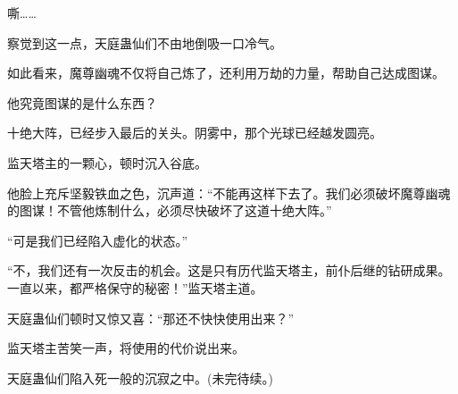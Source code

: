 \begin{this_body}
嘶……

察觉到这一点，天庭蛊仙们不由地倒吸一口冷气。

如此看来，魔尊幽魂不仅将自己炼了，还利用万劫的力量，帮助自己达成图谋。

他究竟图谋的是什么东西？

十绝大阵，已经步入最后的关头。阴雾中，那个光球已经越发圆亮。

监天塔主的一颗心，顿时沉入谷底。

他脸上充斥坚毅铁血之色，沉声道：“不能再这样下去了。我们必须破坏魔尊幽魂的图谋！不管他炼制什么，必须尽快破坏了这道十绝大阵。”

“可是我们已经陷入虚化的状态。”

“不，我们还有一次反击的机会。这是只有历代监天塔主，前仆后继的钻研成果。一直以来，都严格保守的秘密！”监天塔主道。

天庭蛊仙们顿时又惊又喜：“那还不快快使用出来？”

监天塔主苦笑一声，将使用的代价说出来。

天庭蛊仙们陷入死一般的沉寂之中。(未完待续。)

\end{this_body}

